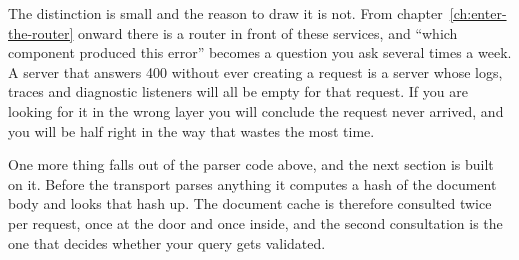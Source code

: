 The distinction is small and the reason to draw it is not. From
chapter~\ref{ch:enter-the-router} onward there is a router in front of these
services, and \enquote{which component produced this error} becomes a question
you ask several times a week. A server that answers 400 without ever creating a
request is a server whose logs, traces and diagnostic listeners will all be
empty for that request. If you are looking for it in the wrong layer you will
conclude the request never arrived, and you will be half right in the way that
wastes the most time.

%
One more thing falls out of the parser code above, and the next section is
built on it. Before the transport parses anything it computes a hash of the
document body and looks that hash up. The document cache is therefore consulted
twice per request, once at the door and once inside, and the second consultation
is the one that decides whether your query gets validated.
